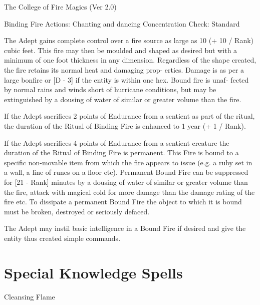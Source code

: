 \begin{Chapter}{The College of Fire Magics (Ver 2.0)}
\begin{ritual}[Q-1]{Binding Fire}
Actions: Chanting and dancing 
Concentration Check: Standard 
\begin{effects}
The Adept gains complete control over a fire source as large as 10 (+
10 / Rank) cubic feet.  This fire may then be moulded and shaped as
desired but with a minimum of one foot thickness in any dimension.
Regardless of the shape created, the fire retains its normal heat and
damaging prop- erties. Damage is as per a large bonfire or [D - 3] if
the entity is within one hex.  Bound fire is unaf- fected by normal
rains and winds short of hurricane conditions, but may be extinguished
by a dousing of water of similar or greater volume than the fire.

If the Adept sacrifices 2 points of Endurance from a sentient as part
of the ritual, the duration of the Ritual of Binding Fire is enhanced
to 1 year (+ 1 / Rank).

If the Adept sacrifices 4 points of Endurance from a sentient creature
the duration of the Ritual of Binding Fire is permanent. This Fire is
bound to a specific non-movable item from which the fire appears to
issue (e.g. a ruby set in a wall, a line of runes on a floor etc).
Permanent Bound Fire can be suppressed for [21 - Rank] minutes by a
dousing of water of similar or greater volume than the fire, attack
with magical cold for more damage than the damage rating of the fire
etc. To dissipate a permanent Bound Fire the object to which it is
bound must be broken, destroyed or seriously defaced.

The Adept may instil basic intelligence in a Bound Fire if desired and
give the entity thus created simple commands.
\end{effects}
\end{ritual}


\section{Special Knowledge Spells}

\begin{spell}[S-1]{Cleansing Flame}


\end{spell}
\end{Chapter}
